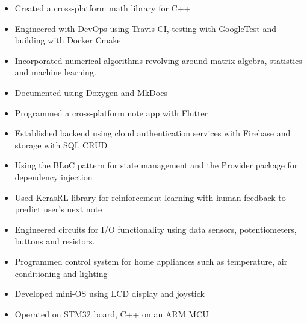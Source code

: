 \documentclass[11pt,a4paper,ragged2e]{altacv}
\begin{document}
\begin{paracol}{1}
\tightdivider
{}
\begin{itemize}
\item Created a cross-platform math library for C++ 
\item Engineered with DevOps using Travis-CI, testing with GoogleTest and building with Docker Cmake
\item Incorporated numerical algorithms revolving around matrix algebra, statistics and machine learning.
\item Documented using Doxygen and MkDocs
\end{itemize}
\tightdivider


\begin{itemize}
\item Programmed a cross-platform note app with Flutter
\item Established backend using cloud authentication services with Firebase and storage with SQL CRUD 
\item Using the BLoC pattern for state management and the Provider package for dependency injection
\item Used KerasRL library for reinforcement learning with human feedback to predict user's next note
\end{itemize}
\tightdivider

\begin{itemize}
\item Engineered circuits for I/O functionality using data sensors, potentiometers, buttons and resistors.
\item Programmed control system for home appliances such as temperature, air conditioning and lighting 
\item Developed mini-OS using LCD display and joystick 
\item Operated on STM32 board, C++ on an ARM MCU
\end{itemize}



\end{paracol}
\end{document}
